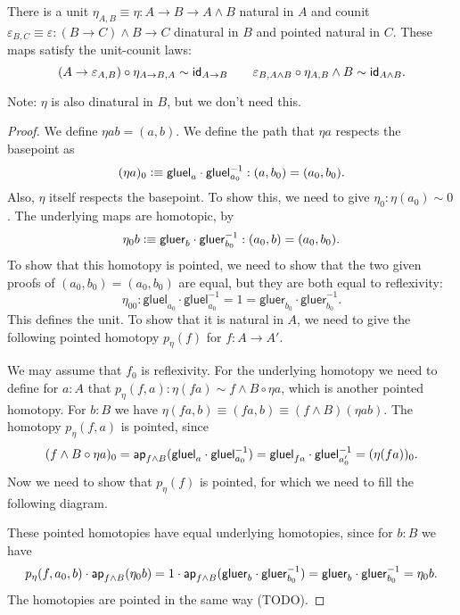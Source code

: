 \documentclass{article}
\newcommand{\pmap}{\to}
\newcommand{\smsh}{\wedge}
\renewcommand{\epsilon}{\varepsilon}
\newcommand{\tr}{\cdot}
\renewcommand{\o}{\ensuremath{\circ}}
\newcommand{\gluel}{\mathsf{gluel}}
\newcommand{\gluer}{\mathsf{gluer}}
\newcommand{\sy}{^{-1}}
\begin{document}
\begin{lem}\label{lem:unit-counit}
  There is a unit $\eta_{A,B}\equiv\eta:A\pmap B\pmap A\smsh B$ natural in $A$ and counit
  $\epsilon_{B,C}\equiv\epsilon : (B\pmap C)\smsh B \pmap C$ dinatural in $B$ and pointed natural in $C$.
  These maps satisfy the unit-counit laws:
  $$(A\to\epsilon_{A,B})\o \eta_{A\to B,A}\sim \idfunc[A\to B]\qquad
  \epsilon_{B,A\smsh B}\o \eta_{A,B}\smsh B\sim\idfunc[A\smsh B].$$
\end{lem}
Note: $\eta$ is also dinatural in $B$, but we don't need this.
\begin{proof}
  We define $\eta ab=(a,b)$. We define the path that $\eta a$ respects the basepoint as
  $$(\eta a)_0\defeq\gluel_a\tr\gluel_{a_0}\sy:(a,b_0)=(a_0,b_0).$$ Also, $\eta$ itself respects the basepoint. To show this, we need to give $\eta_0:\eta (a_0)\sim 0$. The underlying maps are homotopic, by $$\eta_0b\defeq\gluer_b\cdot\gluer_{b_0}\sy:(a_0,b)=(a_0,b_0).$$ To show that
  this homotopy is pointed, we need to show that the two given proofs of $(a_0,b_0)=(a_0,b_0)$ are
  equal, but they are both equal to reflexivity:
  $$\eta_{00}:\gluel_{a_0}\tr\gluel_{a_0}\sy=1=\gluer_{b_0}\tr\gluer_{b_0}\sy.$$
  This defines the unit. To show that it is natural in $A$, we need to give the following pointed homotopy $p_\eta(f)$ for $f:A\to A'$.
  \begin{center}
  \end{center}
  We may assume that $f_0$ is reflexivity. For the underlying homotopy we need to define for $a:A$ that $p_\eta(f,a):\eta(fa)\sim f\smsh B \circ \eta a$, which is another pointed homotopy. For $b:B$ we have $\eta(fa,b)\equiv(fa,b)\equiv(f\smsh B)(\eta ab).$
  The homotopy $p_\eta(f,a)$ is pointed, since $$(f\smsh B \circ \eta a)_0=\apfunc{f\smsh B}(\gluel_a\cdot\gluel_{a_0}\sy)=\gluel_{fa}\cdot\gluel_{a_0'}\sy=(\eta(fa))_0.$$
  Now we need to show that $p_\eta(f)$ is pointed, for which we need to fill the following diagram.
  \begin{center}
  \end{center}
  These pointed homotopies have equal underlying homotopies, since for $b:B$ we have 
  $$p_\eta(f,a_0,b)\cdot\apfunc{f\smsh B}(\eta_0 b)=1\cdot\apfunc{f\smsh B}(\gluer_b\cdot\gluer_{b_0}\sy)=\gluer_{b}\cdot\gluer_{b_0}\sy=\eta_0b.$$
  The homotopies are pointed in the same way (TODO).


\end{proof}
\end{document}
